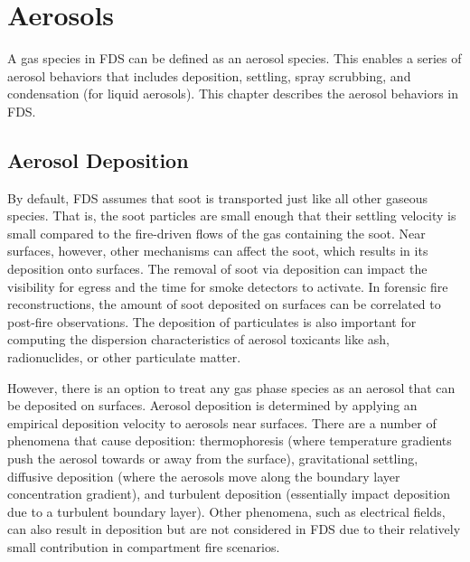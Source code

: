 

\chapter{Aerosols} \label{Aerosols}
\label{chapter:aerosol}

A gas species in FDS can be defined as an aerosol species. This enables a series of aerosol behaviors that includes deposition, settling, spray scrubbing, and condensation (for liquid aerosols). This chapter describes the aerosol behaviors in FDS.

\section{Aerosol Deposition}

By default, FDS assumes that soot is transported just like all other gaseous species. That is, the soot particles are small enough that their settling velocity is small compared to the fire-driven flows of the gas containing the soot. Near surfaces, however, other mechanisms can affect the soot, which results in its deposition onto surfaces. The removal of soot via deposition can impact the visibility for egress and the time for smoke detectors to activate. In forensic fire reconstructions, the amount of soot deposited on surfaces can be correlated to post-fire observations. The deposition of particulates is also important for computing the dispersion characteristics of aerosol toxicants like ash, radionuclides, or other particulate matter.

However, there is an option to treat any gas phase species as an aerosol that can be deposited on surfaces. Aerosol deposition is determined by applying an empirical deposition velocity to aerosols near surfaces. There are a number of phenomena that cause deposition: thermophoresis (where temperature gradients push the aerosol towards or away from the surface), gravitational settling, diffusive deposition (where the aerosols move along the boundary layer concentration
gradient), and turbulent deposition (essentially impact deposition due to a turbulent boundary layer). Other phenomena, such as electrical fields, can also result in deposition but are not considered in FDS due to their relatively small contribution in compartment fire scenarios.

